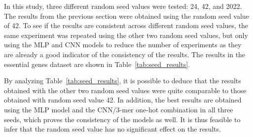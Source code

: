 In this study, three different random seed values were tested: 24, 42, and 2022. The results from the previous section were obtained using the random seed value of 42. To see if the results are consistent across different random seed values, the same experiment was repeated using the other two random seed values, but only using the \gls{MLP} and \gls{CNN} models to reduce the number of experiments as they are already a good indicator of the consistency of the results. The results in the essential genes dataset are shown in Table~\ref{tab:seed_results}. 



By analyzing Table~\ref{tab:seed_results}, it is possible to deduce that the results obtained with the other two random seed values were quite comparable to those obtained with random seed value 42. In addition, the best results are obtained using the MLP model and the CNN/3-mer one-hot combination in all three seeds, which proves the consistency of the models as well. It is thus feasible to infer that the random seed value has no significant effect on the results.